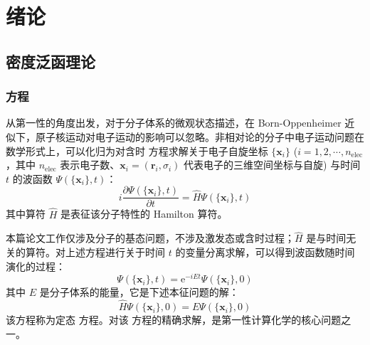 
\chapter{绪论}

\section{密度泛函理论}

\subsection{\Schrodinger 方程}

从第一性的角度出发，对于分子体系的微观状态描述，在 Born-Oppenheimer 近似下\cite{Born-Oppenheimer.AP.1927}，原子核运动对电子运动的影响可以忽略。非相对论的分子中电子运动问题在数学形式上，可以化归为对含时 \Schrodinger 方程\cite{Schroedinger-Schroedinger.PR.1926}求解关于电子自旋坐标 $\{\bm{x}_i\}$ ($i = 1, 2, \cdots, n_\mathrm{elec}$，其中 $n_\mathrm{elec}$ 表示电子数、$\bm{x}_i = (\bm{r}_i, \sigma_i)$ 代表电子的三维空间坐标与自旋) 与时间 $t$ 的波函数 $\Psi(\{\bm{x}_i\}, t)$：
\begin{equation}
  i \frac{\partial \Psi(\{\bm{x}_i\}, t)}{\partial t} = \hat H \Psi(\{\bm{x}_i\}, t)
\end{equation}
其中算符 $\hat H$ 是表征该分子特性的 Hamilton 算符。

本篇论文工作仅涉及分子的基态问题，不涉及激发态或含时过程；$\hat H$ 是与时间无关的算符。对上述方程进行关于时间 $t$ 的变量分离求解，可以得到波函数随时间演化的过程：
\begin{equation}
  \Psi(\{\bm{x}_i\}, t) = \mathrm{e}^{- i E t} \Psi(\{\bm{x}_i\}, 0)
\end{equation}
其中 $E$ 是分子体系的能量，它是下述本征问题的解：
\begin{equation}
  \label{eq.1.tise}
  \hat H \Psi(\{\bm{x}_i\}, 0) = E \Psi(\{\bm{x}_i\}, 0)
\end{equation}
该方程称为定态 \Schrodinger 方程。对该 \Schrodinger 方程的精确求解，是第一性计算化学的核心问题之一。

